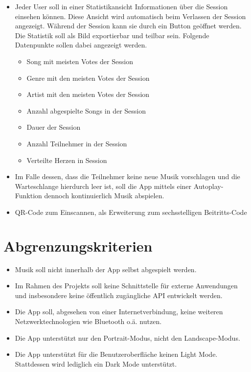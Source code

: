 \documentclass[oneside, ngerman]{sdqtechreport}
\begin{document}
\begin{itemize}
    \item <W1> Jeder User soll in einer Statistikansicht Informationen über die Session einsehen können. Diese Ansicht wird automatisch beim Verlassen der Session angezeigt. Während der Session kann sie durch ein Button geöffnet werden. Die Statistik soll als Bild exportierbar und teilbar sein. 
    Folgende Datenpunkte sollen dabei angezeigt werden. 
    \begin{itemize}
        \item Song mit meisten Votes der Session
        \item Genre mit den meisten Votes der Session
        \item Artist mit den meisten Votes der Session
        \item Anzahl abgespielte Songs in der Session
        \item Dauer der Session
        \item Anzahl Teilnehmer in der Session 
        \item Verteilte Herzen in Session
    \end{itemize}
  
    \item <W2> Im Falle dessen, dass die Teilnehmer keine neue Musik vorschlagen und die Warteschlange hierdurch leer ist, soll die App mittels einer Autoplay-Funktion dennoch kontinuierlich Musik abspielen.
    \item <W3> QR-Code zum Einscannen, als Erweiterung zum sechsstelligen Beitritts-Code

\end{itemize}

\section{Abgrenzungskriterien}
\label{sec:Zielbestimmungen:Abgrenzungskriterien}
\begin{itemize}
    \item <A1> Musik soll nicht innerhalb der App selbst abgespielt werden.
    \item <A2> Im Rahmen des Projekts soll keine Schnittstelle für externe Anwendungen und insbesondere keine öffentlich zugängliche API entwickelt werden.
    \item <A3> Die App soll, abgesehen von einer Internetverbindung, keine weiteren Netzwerktechnologien wie Bluetooth o.ä. nutzen.
    \item <A4> Die App unterstützt nur den Portrait-Modus, nicht den Landscape-Modus.
    \item <A5> Die App unterstützt für die Benutzeroberfläche keinen Light Mode. Stattdessen wird lediglich ein Dark Mode unterstützt.

\end{itemize}
\end{document}
